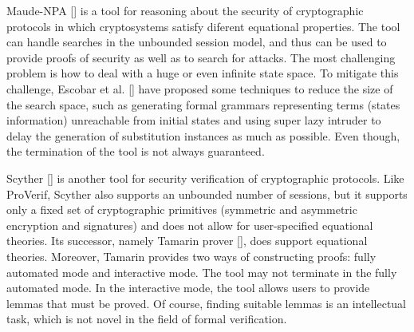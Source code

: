 \documentclass[a4paper,fleqn]{cas-dc}
\begin{document}
Maude-NPA [\cite{maudenpa}] is a tool for reasoning about the security of cryptographic protocols in which cryptosystems satisfy diferent equational properties.
The tool can handle searches in the unbounded session model, and thus can be used to provide proofs of security as well as to search for attacks.
The most challenging problem is how to deal with a huge or even infinite state space.
To mitigate this challenge, Escobar et al. [\cite{maudenpa08}] have proposed some techniques to reduce the size of the search space, such as generating formal grammars representing terms (states information) unreachable from initial states and using super lazy intruder to delay the generation of substitution instances as much as possible.
Even though, the termination of the tool is not always guaranteed.

Scyther [\cite{Scyther08}] is another tool for security verification of cryptographic protocols.
Like ProVerif, Scyther also supports an unbounded number of sessions, but it supports only a fixed set of cryptographic primitives (symmetric and asymmetric encryption and signatures) and does not allow for user-specified equational theories.
Its successor, namely Tamarin prover [\cite{tamarin}], does support equational theories.
Moreover, Tamarin  provides two ways of constructing proofs: fully automated mode and interactive mode. 
The tool may not terminate in the fully automated mode.
In the interactive mode, the tool allows users to provide lemmas that must be proved. 
Of course, finding suitable lemmas is an intellectual task, which is not novel in the field of formal verification.
\end{document}

